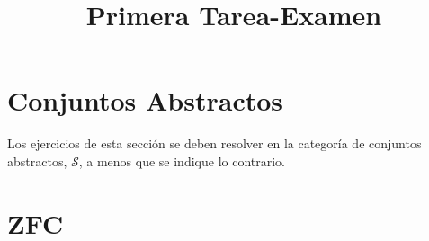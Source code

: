 \documentclass[12pt]{article}
\title{Primera Tarea-Examen}
\author{}
\date{}
\newcommand{\topos}[1]{\mathscr{#1}}
\begin{document}
    \maketitle

    \section*{Conjuntos Abstractos}
    Los ejercicios de esta sección se deben resolver en la categoría de
    conjuntos abstractos, \(\topos{S}\), a menos que se indique lo contrario.

    
    

    \section*{ZFC}
    
\end{document}
